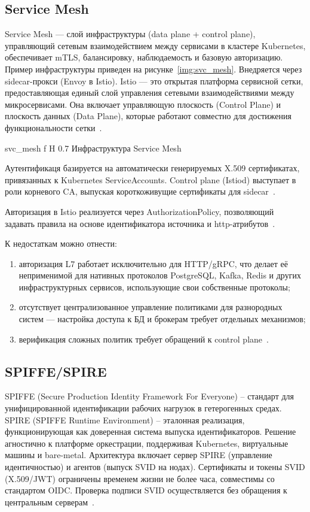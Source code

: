 \subsection{Service Mesh}

Service Mesh --- слой инфраструктуры (data plane + control plane), управляющий сетевым взаимодействием между сервисами в кластере Kubernetes, обеспечивает mTLS, балансировку, наблюдаемость и базовую авторизацию. Пример инфраструктуры приведен на рисунке~\ref{img:svc_mesh}. Внедряется через sidecar-прокси (Envoy в Istio).
Istio --- это открытая платформа сервисной сетки, предоставляющая единый слой управления сетевыми взаимодействиями между микросервисами. Она включает управляющую плоскость (Control Plane) и плоскость данных (Data Plane), которые работают совместно для достижения функциональности сетки~\cite{svc_mesh_cite}.

    {svc_mesh}
    {f}
    {H}
    {0.7\textwidth}
    {Инфраструктура Service Mesh}

Аутентификаця базируется на автоматически генерируемых X.509 сертификатах, привязанных к Kubernetes ServiceAccounts. Control plane (Istiod) выступает в роли корневого CA, выпуская короткоживущие сертификаты для sidecar~\cite{svcmesh_tls}.

Авторизация в Istio реализуется через AuthorizationPolicy, позволяющий задавать правила на основе идентификатора источника и http-атрибутов~\cite{svc_mesh_cite}.

К недостаткам можно отнести:
\begin{enumerate}
	\item авторизация L7 работает исключительно для HTTP/gRPC, что делает её неприменимой для нативных протоколов PostgreSQL, Kafka, Redis и других инфраструктурных сервисов, использующие свои собственные протоколы;
	\item отсутствует централизованное управление политиками для разнородных систем --- настройка доступа к БД и брокерам требует отдельных механизмов;
	\item верификация сложных политик требует обращений к control plane~\cite{svc_mesh_cite}.
\end{enumerate}

\subsection{SPIFFE/SPIRE}

SPIFFE (Secure Production Identity Framework For Everyone) – стандарт для унифицированной идентификации рабочих нагрузок в гетерогенных средах. SPIRE (SPIFFE Runtime Environment) – эталонная реализация, функционирующая как доверенная система выпуска идентификаторов. Решение агностично к платформе оркестрации, поддерживая Kubernetes, виртуальные машины и bare-metal. Архитектура включает сервер SPIRE (управление идентичностью) и агентов (выпуск SVID на нодах).
Сертификаты и токены SVID (X.509/JWT) ограничены временем жизни не более часа, совместимы со стандартом OIDC. Проверка подписи SVID осуществляется без обращения к центральным серверам~\cite{spiffe}. 

